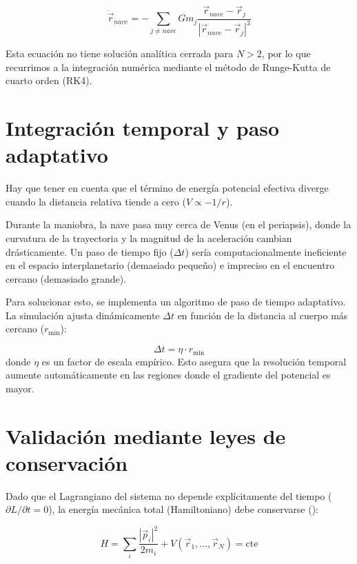 \documentclass{article}
\begin{document}
\begin{equation}
    \ddot{\vec{r}}_{nave} = - \sum_{j \neq nave} G m_j \frac{\vec{r}_{nave} - \vec{r}_j}{|\vec{r}_{nave} - \vec{r}_j|^3}
\end{equation}

Esta ecuación no tiene solución analítica cerrada para $N > 2$, por lo que recurrimos a la integración numérica mediante el método de Runge-Kutta de cuarto orden (RK4).

\section{Integración temporal y paso adaptativo}

Hay que tener en cuenta que el término de energía potencial efectiva diverge cuando la distancia relativa tiende a cero ($V \propto -1/r$).

Durante la maniobra, la nave pasa muy cerca de Venus (en el periapsis), donde la curvatura de la trayectoria y la magnitud de la aceleración cambian drásticamente. Un paso de tiempo fijo ($\Delta t$) sería computacionalmente ineficiente en el espacio interplanetario (demasiado pequeño) e impreciso en el encuentro cercano (demasiado grande).

Para solucionar esto, se implementa un algoritmo de paso de tiempo adaptativo. La simulación ajusta dinámicamente $\Delta t$ en función de la distancia al cuerpo más cercano ($r_\text{min}$):

\begin{equation}
    \Delta t = \eta \cdot r_\text{min}
\end{equation}
donde $\eta$ es un factor de escala empírico. Esto asegura que la resolución temporal aumente automáticamente en las regiones donde el gradiente del potencial es mayor.

\section{Validación mediante leyes de conservación}

Dado que el Lagrangiano del sistema no depende explícitamente del tiempo ($\partial L / \partial t = 0$), la energía mecánica total (Hamiltoniano) debe conservarse (\cite{teoria_mecanica}):

\begin{equation}
    H = \sum_{i} \frac{|\vec{p}_i|^2}{2m_i} + V(\vec{r}_1, ..., \vec{r}_N) = \text{cte}
\end{equation}
\end{document}
